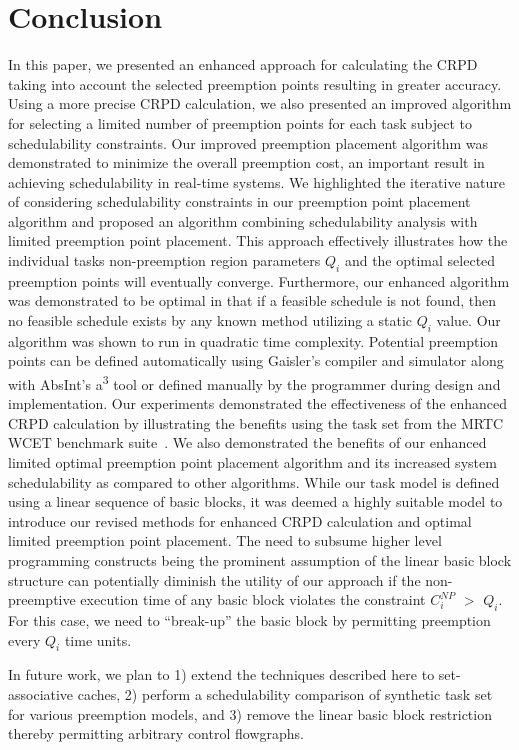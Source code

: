 \section{Conclusion}\label{sec:conclusion}

In this paper, we presented an enhanced approach for calculating the
CRPD taking into account the selected preemption points resulting
in greater accuracy.  Using a more precise CRPD calculation, we also
presented an improved algorithm for selecting a limited number of
preemption points for each task subject to schedulability constraints.
Our improved preemption placement algorithm was demonstrated to
minimize the overall preemption cost, an important result in achieving
schedulability in real-time systems.  We highlighted the iterative nature
of considering schedulability constraints in our preemption point
placement algorithm and proposed an algorithm combining schedulability
analysis with limited preemption point placement.  This approach
effectively illustrates how the individual tasks non-preemption
region parameters $Q_i$ and the optimal selected preemption points will
eventually converge.  Furthermore, our enhanced algorithm was demonstrated to be
optimal in that if a feasible schedule is not found, then no feasible
schedule exists by any known method utilizing a static $Q_i$ value.  Our algorithm
was shown to run in quadratic time complexity.  Potential preemption points can be
defined automatically using Gaisler's compiler and simulator along with AbsInt's
a\textsuperscript{3} tool or defined manually by the programmer during design
and implementation. Our experiments demonstrated the effectiveness of
the enhanced CRPD calculation by illustrating the benefits using the
task set from the MRTC WCET benchmark suite~\cite{mrtc:01}.
We also demonstrated the benefits of our enhanced limited optimal preemption
point placement algorithm and its increased system schedulability as
compared to other algorithms.  While our task model is defined using a linear
sequence of basic blocks, it was deemed a highly suitable model to introduce
our revised methods for enhanced CRPD calculation and optimal limited
preemption point placement.  The need to subsume higher level programming constructs
being the prominent assumption of the linear basic block structure can potentially
diminish the utility of our approach if the non-preemptive execution time of any basic block
violates the constraint \begin{math}C_{i}^{NP}\end{math} \begin{math}>\end{math} \begin{math}Q_{i}\end{math}.  For this case, we need to ``break-up'' the basic block by permitting preemption every $Q_i$ time units.

In future work, we plan to 1) extend the techniques described here to set-associative caches,
2) perform a schedulability comparison of synthetic task set for various preemption models, and
3) remove the linear basic block restriction thereby permitting arbitrary control flowgraphs.
